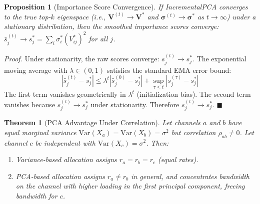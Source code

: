 \documentclass[journal]{IEEEtran}
\newtheorem{proposition}{Proposition}
\newtheorem{theorem}{Theorem}
\renewenvironment{proof}[1][Proof]{\noindent\textit{#1.}\space}{\hfill$\blacksquare$\par\medskip}
\begin{document}
\begin{proposition}[Importance Score Convergence]
\label{prop:convergence}
If IncrementalPCA converges to the true top-$k$ eigenspace (i.e., $\mathbf{V}^{(t)} \to \mathbf{V}^*$ and $\boldsymbol{\sigma}^{(t)} \to \boldsymbol{\sigma}^*$ as $t \to \infty$) under a stationary distribution, then the smoothed importance scores converge: $\bar{s}_j^{(t)} \to s_j^* = \sum_i \sigma_i^* (V_{ij}^*)^2$ for all $j$.
\end{proposition}

\begin{proof}
Under stationarity, the raw scores converge: $s_j^{(t)} \to s_j^*$. The exponential moving average with $\lambda \in (0, 1)$ satisfies the standard EMA error bound:
\begin{equation}
|\bar{s}_j^{(t)} - s_j^*| \leq \lambda^t |\bar{s}_j^{(0)} - s_j^*| + \sup_{\tau \leq t} |s_j^{(\tau)} - s_j^*|
\end{equation}
The first term vanishes geometrically in $\lambda^t$ (initialization bias). The second term vanishes because $s_j^{(t)} \to s_j^*$ under stationarity. Therefore $\bar{s}_j^{(t)} \to s_j^*$.
\end{proof}

\begin{theorem}[PCA Advantage Under Correlation]
\label{thm:correlation}
Let channels $a$ and $b$ have equal marginal variance $\text{Var}(X_a) = \text{Var}(X_b) = \sigma^2$ but correlation $\rho_{ab} \neq 0$. Let channel $c$ be independent with $\text{Var}(X_c) = \sigma^2$. Then:
\begin{enumerate}[leftmargin=*]
\item Variance-based allocation assigns $r_a = r_b = r_c$ (equal rates).
\item PCA-based allocation assigns $r_a \neq r_b$ in general, and concentrates bandwidth on the channel with higher loading in the first principal component, freeing bandwidth for $c$.
\end{enumerate}
\end{theorem}
\end{document}
